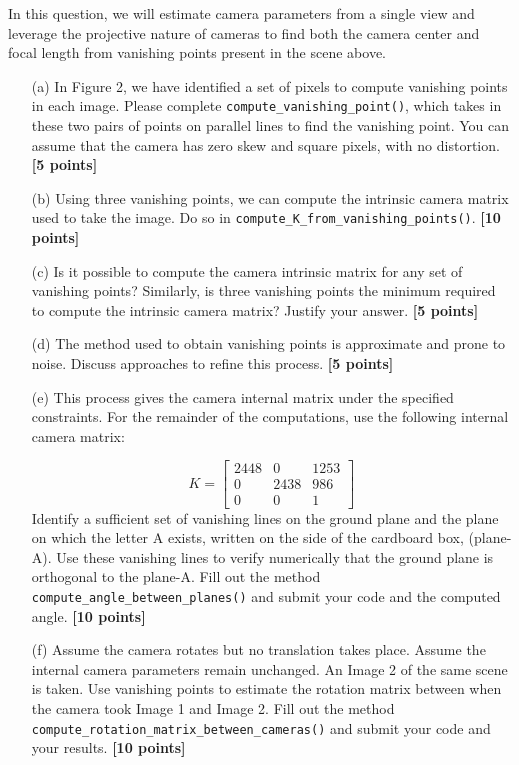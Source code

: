 In this question, we will estimate camera parameters from a single view and leverage the projective nature of cameras to find both the camera center and focal length from vanishing points present in the scene above.

\begin{itemize}
\item[(a)]  In Figure 2, we have identified a set of pixels to compute vanishing points in each image. Please complete \texttt{compute\_vanishing\_point()}, which takes in these two pairs of points on parallel lines to find the vanishing point. You can assume that the camera has zero skew and square pixels, with no distortion. {\bf [5 points]}

\item[(b)] Using three vanishing points, we can compute the intrinsic camera matrix used to take the image. Do so in \texttt{compute\_K\_from\_vanishing\_points()}. {\bf [10 points]}

\item[(c)] Is it possible to compute the camera intrinsic matrix for any set of vanishing points? Similarly, is three vanishing points the minimum required to compute the intrinsic camera matrix? Justify your answer. {\bf [5 points]}

\item[(d)] The method used to obtain vanishing points is approximate and prone to noise. Discuss approaches to refine this process. {\bf [5 points]}

\item[(e)] This process gives the camera internal matrix under the specified constraints. For the remainder of the computations, use the following internal camera matrix:

 \[
  K = \left [
  \begin{matrix}
  2448 & 0 & 1253 \\
  0 & 2438 & 986 \\
  0 & 0 & 1
  \end{matrix}
  \right ]
    \]
 Identify a sufficient set of vanishing lines on the ground plane and the plane on which the letter A exists, written on the side of the cardboard box, (plane-A). Use these vanishing lines to verify numerically that the ground plane is orthogonal to the plane-A. Fill out the method \texttt{compute\_angle\_between\_planes()} and submit your code and the computed angle. {\bf [10 points]}

\item[(f)] Assume the camera rotates but no translation takes place. Assume the internal camera parameters remain unchanged. An Image 2 of the same scene is taken. Use vanishing points to estimate the rotation matrix between when the camera took Image 1 and Image 2. Fill out the method \texttt{compute\_rotation\_matrix\_between\_cameras()} and submit your code and your results. {\bf [10 points]}
\end{itemize}





